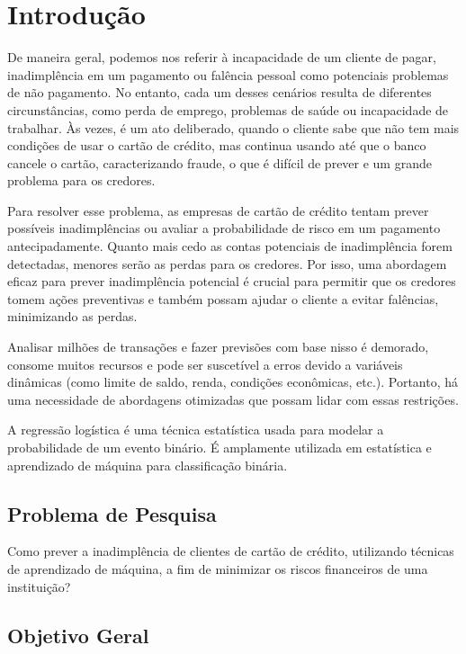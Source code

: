 \documentclass{abntpuc}
\author         {Gabriel Machado \\ João Pedro Garcia \\ Matheus Lopes \\ Miguel Battendieri \\ Pedro Vendrametto}
\begin{document}
\capa

\folharosto

\tableofcontents

\chapter{Introdução}

De maneira geral, podemos nos referir à incapacidade de um cliente de pagar, inadimplência em um pagamento ou falência pessoal como potenciais problemas de não pagamento. No entanto, cada um desses cenários resulta de diferentes circunstâncias, como perda de emprego, problemas de saúde ou incapacidade de trabalhar. Às vezes, é um ato deliberado, quando o cliente sabe que não tem mais condições de usar o cartão de crédito, mas continua usando até que o banco cancele o cartão, caracterizando fraude, o que é difícil de prever e um grande problema para os credores.

Para resolver esse problema, as empresas de cartão de crédito tentam prever possíveis inadimplências ou avaliar a probabilidade de risco em um pagamento antecipadamente. Quanto mais cedo as contas potenciais de inadimplência forem detectadas, menores serão as perdas para os credores. Por isso, uma abordagem eficaz para prever inadimplência potencial é crucial para permitir que os credores tomem ações preventivas e também possam ajudar o cliente a evitar falências, minimizando as perdas.

Analisar milhões de transações e fazer previsões com base nisso é demorado, consome muitos recursos e pode ser suscetível a erros devido a variáveis dinâmicas (como limite de saldo, renda, condições econômicas, etc.). Portanto, há uma necessidade de abordagens otimizadas que possam lidar com essas restrições.

A regressão logística é uma técnica estatística usada para modelar a probabilidade de um evento binário. É amplamente utilizada em estatística e aprendizado de máquina para classificação binária.

\section{Problema de Pesquisa}

Como prever a inadimplência de clientes de cartão de crédito, utilizando técnicas de aprendizado de máquina, a fim de minimizar os riscos financeiros de uma instituição?

\section{Objetivo Geral}
\end{document}
